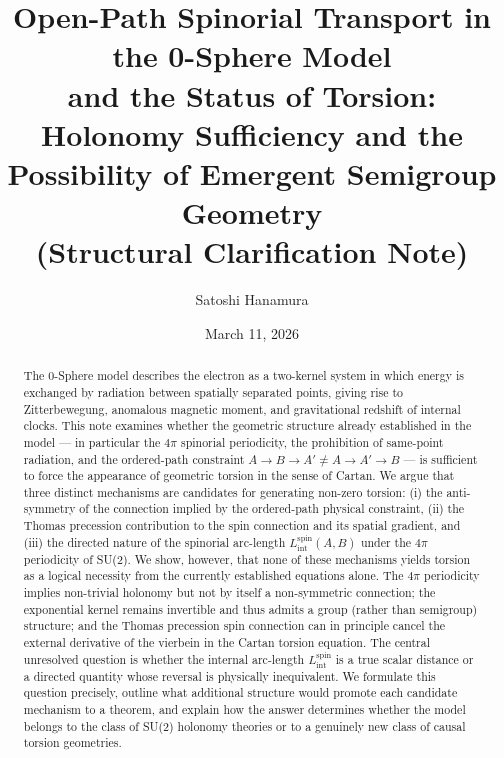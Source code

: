 \documentclass[%
 reprint,
 amsmath,amssymb,
 aps,
 prb,
]{revtex4-2}
\numberwithin{equation}{section}
\newcommand{\Lspin}{L_{\text{int}}^{\text{spin}}}
\begin{document}
\title{Open-Path Spinorial Transport in the 0-Sphere Model\\
and the Status of Torsion:\\
Holonomy Sufficiency and the Possibility of Emergent Semigroup Geometry\\
{\normalsize (Structural Clarification Note)}}

\author{Satoshi Hanamura}
\date{March 11, 2026}

\begin{abstract}
The 0-Sphere model describes the electron as a two-kernel system in which energy is exchanged by radiation between spatially separated points, giving rise to Zitterbewegung, anomalous magnetic moment, and gravitational redshift of internal clocks. This note examines whether the geometric structure already established in the model --- in particular the $4\pi$ spinorial periodicity, the prohibition of same-point radiation, and the ordered-path constraint $A\to B\to A' \neq A\to A'\to B$ --- is sufficient to force the appearance of geometric torsion in the sense of Cartan. We argue that three distinct mechanisms are candidates for generating non-zero torsion: (i) the anti-symmetry of the connection implied by the ordered-path physical constraint, (ii) the Thomas precession contribution to the spin connection and its spatial gradient, and (iii) the directed nature of the spinorial arc-length $\Lspin(A,B)$ under the $4\pi$ periodicity of SU(2). We show, however, that none of these mechanisms yields torsion as a logical necessity from the currently established equations alone. The $4\pi$ periodicity implies non-trivial holonomy but not by itself a non-symmetric connection; the exponential kernel remains invertible and thus admits a group (rather than semigroup) structure; and the Thomas precession spin connection can in principle cancel the external derivative of the vierbein in the Cartan torsion equation. The central unresolved question is whether the internal arc-length $\Lspin$ is a true scalar distance or a directed quantity whose reversal is physically inequivalent. We formulate this question precisely, outline what additional structure would promote each candidate mechanism to a theorem, and explain how the answer determines whether the model belongs to the class of SU(2) holonomy theories or to a genuinely new class of causal torsion geometries.
\end{abstract}

\maketitle
\end{document}
